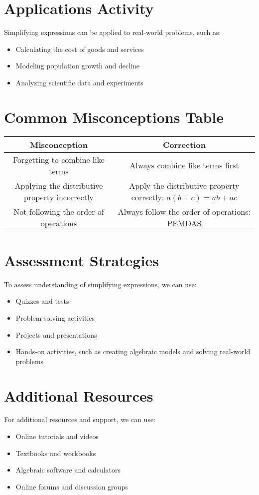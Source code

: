 \documentclass{article}
\begin{document}
\section{Applications Activity}
Simplifying expressions can be applied to real-world problems, such as:
\begin{itemize}
\item Calculating the cost of goods and services
\item Modeling population growth and decline
\item Analyzing scientific data and experiments
\end{itemize}

\section{Common Misconceptions Table}
\begin{center}
\begin{tabular}{|c|c|}
\hline Misconception & Correction \\
\hline Forgetting to combine like terms & Always combine like terms first \\
\hline Applying the distributive property incorrectly & Apply the distributive property correctly: $a(b + c) = ab + ac$ \\
\hline Not following the order of operations & Always follow the order of operations: PEMDAS \\
\hline
\end{tabular}
\end{center}

\section{Assessment Strategies}
To assess understanding of simplifying expressions, we can use:
\begin{itemize}
\item Quizzes and tests
\item Problem-solving activities
\item Projects and presentations
\item Hands-on activities, such as creating algebraic models and solving real-world problems
\end{itemize}

\section{Additional Resources}
For additional resources and support, we can use:
\begin{itemize}
\item Online tutorials and videos
\item Textbooks and workbooks
\item Algebraic software and calculators
\item Online forums and discussion groups
\end{itemize}
\end{document}
